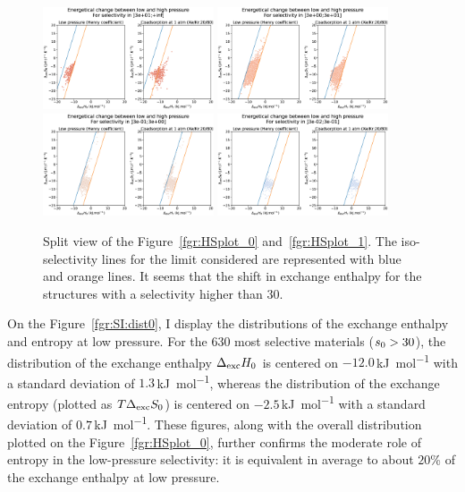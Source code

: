 \documentclass[main.tex]{subfiles}
\begin{document}
\begin{figure}[ht]
  \centering
    \includegraphics[width=0.45\textwidth]{figures/2-thermo/H_S_0.jpg}
    \includegraphics[width=0.45\textwidth]{figures/2-thermo/H_S_1.jpg}
    \includegraphics[width=0.45\textwidth]{figures/2-thermo/H_S_2.jpg}
    \includegraphics[width=0.45\textwidth]{figures/2-thermo/H_S_3.jpg}
    \caption{Split view of the Figure~\ref{fgr:HSplot_0} and~\ref{fgr:HSplot_1}. The iso-selectivity lines for the limit considered are represented with blue and orange lines. It seems that the shift in exchange enthalpy for the structures with a selectivity higher than $30$.}\label{fgr:SI:HS_split}
\end{figure}


On the Figure~\ref{fgr:SI:dist0}, I display the distributions of the exchange enthalpy and entropy at low pressure. For the 630 most selective materials ($s_{\text{0}} > 30$), the distribution of the exchange enthalpy $\Delta_{\text{exc}}H_{\text{0}}$ is centered on $-12.0$\,\si{\kilo\joule\per\mol} with a standard deviation of $1.3$\,\si{\kilo\joule\per\mol}, whereas the distribution of the exchange entropy (plotted as $T\Delta_{\text{exc}}S_{\text{0}}$) is centered on $-2.5$\,\si{\kilo\joule\per\mol} with a standard deviation of $0.7$\,\si{\kilo\joule\per\mol}. These figures, along with the overall distribution plotted on the Figure~\ref{fgr:HSplot_0}, further confirms the moderate role of entropy in the low-pressure selectivity: it is equivalent in average to about {$20$\%} of the exchange enthalpy at low pressure.
\end{document}
